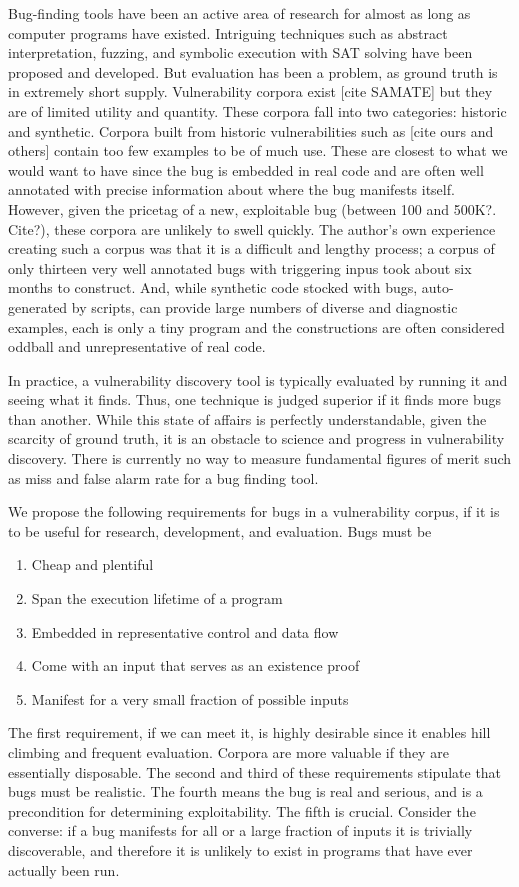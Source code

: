 \label{sec:motivation}

Bug-finding tools have been an active area of research for almost as long as computer programs have existed. 
Intriguing techniques such as abstract interpretation, fuzzing, and symbolic execution with SAT solving have been proposed and developed.
But evaluation has been a problem, as  ground truth is in extremely short supply.
Vulnerability corpora exist [cite SAMATE] but they are of limited utility and quantity.
These corpora fall into two categories: historic and synthetic.
Corpora built from historic vulnerabilities such as [cite ours and others] contain too few examples to be of much use.
These are closest to what we would want to have since the bug is embedded in real code and are often well annotated with precise information about where the bug manifests itself.
However, given the pricetag of a new, exploitable bug (between 100 and 500K?. Cite?), these corpora are unlikely to swell quickly.
The author's own experience creating such a corpus was that it is a difficult and lengthy process; a corpus of only thirteen very well annotated bugs with triggering inpus took about six months to construct. 
And, while synthetic code stocked with bugs, auto-generated by scripts, can provide large numbers of diverse and diagnostic examples, each is only a tiny program and the constructions are often considered oddball and unrepresentative of real code.

In practice, a vulnerability discovery tool is typically evaluated by running it and seeing what it finds. 
Thus, one technique is judged superior if it finds more bugs than another.
While this state of affairs is perfectly understandable, given the scarcity of ground truth, it is an obstacle to science and progress in vulnerability discovery.
There is currently no way to measure fundamental figures of merit such as miss and false alarm rate for a bug finding tool.

We propose the following requirements for bugs in a vulnerability corpus, if it is to be useful for research, development, and evaluation.
Bugs must be
\begin{enumerate}
\item Cheap and plentiful
\item Span the execution lifetime of a program
\item Embedded in representative control and data flow
\item Come with an input that serves as an existence proof 
\item Manifest for a very small fraction of possible inputs
\end {enumerate}
The first requirement, if we can meet it, is highly desirable since it enables hill climbing and frequent evaluation.
Corpora are more valuable if they are essentially disposable. 
The second and third of these requirements stipulate that bugs must be realistic.
The fourth means the bug is real and serious, and is a precondition for determining exploitability. 
The fifth is crucial.
Consider the converse: if a bug manifests for all or a large fraction of inputs it is trivially discoverable, and therefore it is unlikely to exist in programs that have ever actually been run.

